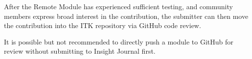 After the Remote Module has experienced sufficient testing, and community
members express broad interest in the contribution, the submitter can then move
the contribution into the ITK repository via GitHub code review.

It is possible but not recommended to directly push a module to GitHub for
review without submitting to Insight Journal first.

